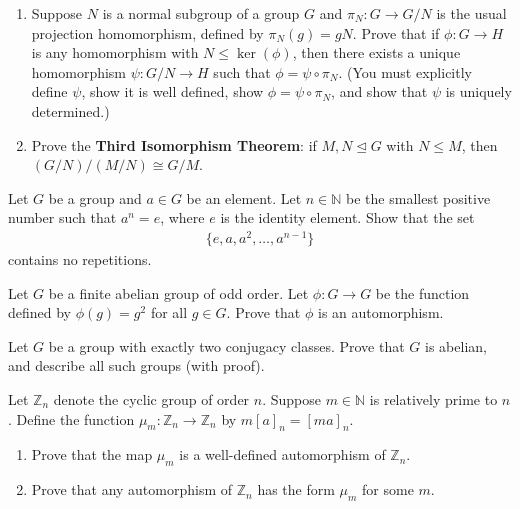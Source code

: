\documentclass[11pt,twoside,openany]{memoir}
\begin{document}
        \newpage
        \begin{exercise}
            \phantom{a}
        \begin{enumerate}[label=(\alph*)]
            \item Suppose $N$ is a normal subgroup of a group $G$ and $\pi_N:G\to G/N$ is the usual projection homomorphism, defined by $\pi_N(g)=gN$. Prove that if $\phi:G\to H$ is any homomorphism with $N\leq \ker(\phi)$, then there exists a unique homomorphism $\psi:G/N\to H$ such that $\phi = \psi\circ \pi_N$. (You must explicitly define $\psi$, show it is well defined, show $\phi=\psi\circ\pi_N$, and show that $\psi$ is uniquely determined.)
            \item Prove the 
            \textbf{Third Isomorphism Theorem}: if $M, N\unlhd G$ with $N\le M$, then $(G/N)/(M/N)\cong G/M$.
        \end{enumerate}
        \end{exercise}
        
        \begin{exercise}
        Let $G$ be a group and $a\in G$ be an element. Let $n\in \mathbb{N}$ be the smallest positive number such that $a^n=e$, where $e$ is the identity element. Show that the set
        \begin{equation*}
        \begin{split}
        \{e,a,a^2,\ldots, a^{n-1}\}
        \end{split}
        \end{equation*}
        contains no repetitions.
        \end{exercise}
        
        \begin{exercise}
        Let $G$ be a finite abelian group of odd order. Let $\phi:G\to G$ be the function defined by $\phi(g)=g^2$ for all $g\in G$. Prove that $\phi$ is an automorphism.
        \end{exercise}
        
        \begin{exercise}
        Let $G$ be a group with exactly two conjugacy classes. Prove that $G$ is abelian, and describe all such groups (with proof).
        \end{exercise}
        
        \begin{exercise}
        Let $\mathbb{Z}_n$ denote the cyclic group of order $n$. Suppose $m\in \mathbb{N}$ is relatively prime to $n$. Define the function $\mu_m:\mathbb{Z}_n\to \mathbb{Z}_n$ by $m[a]_n=[ma]_n$.
        \begin{enumerate}[label=(\alph*)]
            \item Prove that the map $\mu_m$ is a well-defined automorphism of $\mathbb{Z}_n$.
            \item Prove that any automorphism of $\mathbb{Z}_n$ has the form $\mu_m$ for some $m$.
        \end{enumerate}
        \end{exercise}
        
\end{document}
